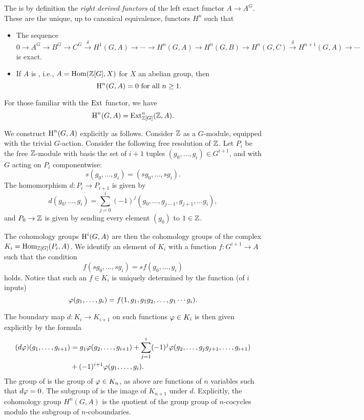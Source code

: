 \begin{definition}
The  is by definition the
{\em right derived functors} of the left exact functor $A \to A^G$.
These are the unique, up to canonical equivalence, functors $H^n$
such that
\begin{itemize}
\item The sequence
$$
 0 \to A^G \to B^G \to C^G \xrightarrow{\delta} 
H^1(G,A) \to \cdots \to H^n(G,A) \to H^n(G,B) \to H^n(G,C) \xrightarrow{\delta} H^{n+1}(G,A) \to \cdots
$$
is exact. 
\item If $A$ is , i.e., $A = \operatorname{Hom}(\mathbb{Z}[G], X)$ for $X$ an abelian group, then
$$
  \operatorname{H}^n(G,A) = 0 \text{ for all $n\geq 1$}.
$$
\end{itemize}
\end{definition}

\begin{remark}
For those familiar with the $\operatorname{Ext}$ functor, we have
$$
\operatorname{H}^n(G,A) = \operatorname{Ext}_{\mathbb{Z}[G]}^n(\mathbb{Z},A).
$$
\end{remark}

We construct $\operatorname{H}^n(G,A)$ explicitly as follows.
Consider $\mathbb{Z}$ as a $G$-module, equipped with the
trivial $G$-action.
Consider the following free resolution of $\mathbb{Z}$.
Let $P_i$ be the free $\mathbb{Z}$-module with basis
the set of $i+1$ tuples
$(g_0,\ldots, g_i) \in G^{i+1}$, and
with $G$ acting on $P_i$ componentwise:
$$
   s (g_0,\ldots, g_i) = (sg_0, \ldots, sg_i).
$$
The homomorphism $d:P_i\to P_{i+1}$ is given
by 
$$
 d(g_0,\ldots, g_i) = \sum_{j=0}^{i} (-1)^j
       (g_0,\ldots,g_{j-1},g_{j+1},\ldots g_i),
$$
and $P_0\to \mathbb{Z}$ is given by sending every
element $(g_0)$ to $1\in\mathbb{Z}$. 

The cohomology groups $\operatorname{H}^i(G,A)$ are then
the cohomology groups of the complex
$K_i = \operatorname{Hom}_{\mathbb{Z}[G]}(P_i, A)$. 
We identify an element of $K_i$
with a function $f:G^{i+1} \to A$
such that the condition
$$
  f(sg_0,\ldots, sg_i) = s f(g_0,\ldots, g_i)
$$
holds. 
Notice that such an $f\in K_i$ is uniquely determined
by the function (of $i$ inputs)
$$
 \varphi(g_1,\ldots, g_i) = f(1,g_1,g_1 g_2, \ldots, g_1\cdots g_i).
$$

The boundary map $d:K_i\to K_{i+1}$
on such functions $\varphi \in K_{i}$
is then given explicitly by the formula
\begin{align*}
 (d\varphi)(g_1,\ldots, g_{i+1})
    &= g_1 \varphi(g_2,\ldots, g_{i+1}) 
   + \sum_{j=1}^{i} (-1)^j \varphi(g_2,\ldots, g_{j} g_{j+1}, \ldots, g_{i+1})\\
   &+ (-1)^{i+1} \varphi(g_1,\ldots, g_{i}).
 \end{align*}
The group of 
 is the group of $\varphi \in K_{n}$, 
as above are functions of $n$ variables such that
$d\varphi = 0$.
The subgroup of 
is the image of $K_{n+1}$ 
under $d$.
Explicitly, the cohomology group $H^n(G,A)$ is 
the quotient of the group group of $n$-cocycles
modulo the subgroup of $n$-coboundaries. 

